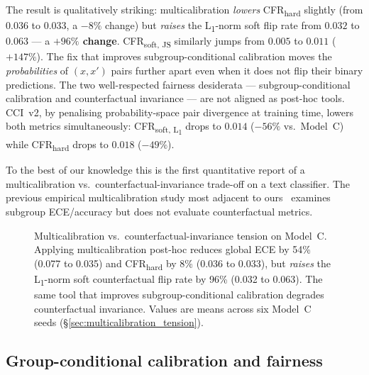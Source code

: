 \documentclass[10pt,a4paper]{article}
\begin{document}
The result is qualitatively striking: multicalibration \emph{lowers} CFR\textsubscript{hard} slightly (from $0.036$ to $0.033$, a $-8\%$ change) but \emph{raises} the L\textsubscript{1}-norm soft flip rate from $0.032$ to $0.063$ --- a \textbf{$+96\%$ change}. CFR\textsubscript{soft, JS} similarly jumps from $0.005$ to $0.011$ ($+147\%$). The fix that improves subgroup-conditional calibration moves the \emph{probabilities} of $(x, x')$ pairs further apart even when it does not flip their binary predictions. The two well-respected fairness desiderata --- subgroup-conditional calibration and counterfactual invariance --- are not aligned as post-hoc tools. CCI~v2, by penalising probability-space pair divergence at training time, lowers both metrics simultaneously: CFR\textsubscript{soft, L\textsubscript{1}} drops to $0.014$ ($-56\%$ vs.\ Model~C) while CFR\textsubscript{hard} drops to $0.018$ ($-49\%$).

To the best of our knowledge this is the first quantitative report of a multicalibration vs.\ counterfactual-invariance trade-off on a text classifier. The previous empirical multicalibration study most adjacent to ours~\citep{hansen2024multicalibration} examines subgroup ECE/accuracy but does not evaluate counterfactual metrics.

\begin{figure}[h]
\centering
\caption{Multicalibration vs.\ counterfactual-invariance tension on Model~C. Applying multicalibration post-hoc reduces global ECE by 54\% (0.077 to 0.035) and CFR\textsubscript{hard} by 8\% (0.036 to 0.033), but \emph{raises} the L\textsubscript{1}-norm soft counterfactual flip rate by 96\% (0.032 to 0.063). The same tool that improves subgroup-conditional calibration degrades counterfactual invariance. Values are means across six Model~C seeds (\S\ref{sec:multicalibration_tension}).}
\label{fig:panel_multicalib}
\end{figure}

\subsection{Group-conditional calibration and fairness}
\label{sec:fairness}
\end{document}
